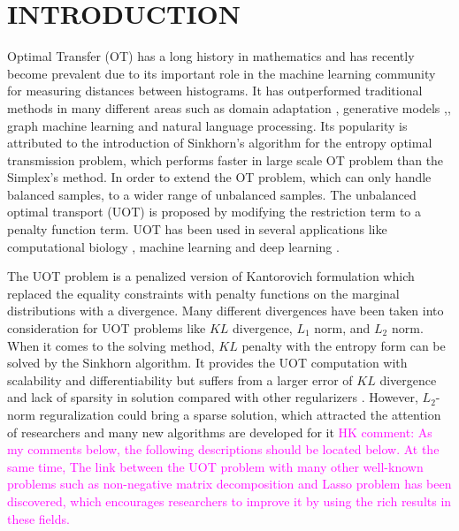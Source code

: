 \documentclass[twoside]{article}
\theoremstyle{plain}
\newcommand{\note}[1]{\textcolor{magenta}{#1}}
\begin{document}
\section{INTRODUCTION}
Optimal Transfer (OT) has a long history in mathematics and has recently become prevalent due to its important role in the machine learning community for measuring distances between histograms. It has outperformed traditional methods in many different areas such as domain adaptation \citep{7586038}, generative models \citep{arjovsky2017wasserstein},, graph machine learning \citep{NEURIPS2019_fdd5b16f} and natural language processing. \citep{084adf2f555549c493e0331a00e4ecad} Its popularity is attributed to the introduction of Sinkhorn's algorithm for the entropy optimal transmission problem, \citep{NIPS2013_af21d0c9} which performs faster in large scale OT problem than the Simplex's method. In order to extend the OT problem, which can only handle balanced samples, to a wider range of unbalanced samples. The unbalanced optimal transport (UOT) is proposed by modifying the restriction term to a penalty function term. UOT has been used in several applications like computational biology \citep{SCHIEBINGER2019928} , machine learning \citep{DBLP:conf/aistats/JanatiCG19} and deep learning \citep{DBLP:conf/iclr/YangU19}. 

The UOT problem is a penalized version of Kantorovich formulation which replaced the equality constraints with penalty functions on the marginal distributions with a divergence. Many different divergences have been taken into consideration for UOT problems like $KL$ divergence, $L_1$ norm, and $L_2$ norm. When it comes to the solving method, $KL$ penalty with the entropy form can be solved by the Sinkhorn algorithm. It provides the UOT computation with scalability and differentiability but suffers from a larger error of $KL$ divergence and lack of sparsity in solution compared with other regularizers \citep{DBLP:conf/aistats/BlondelSR18}. However, $L_2$-norm reguralization could bring a sparse solution, which attracted the attention of researchers and many new algorithms are developed for it \citep{NEURIPS2021_c3c617a9,https://doi.org/10.48550/arxiv.2202.03618} \note{HK comment: As my comments below, the following descriptions should be located below. At the same time, The link between the UOT problem with many other well-known problems such as non-negative matrix decomposition and Lasso problem has been discovered, which encourages researchers to improve it by using the rich results in these fields.}
\end{document}
